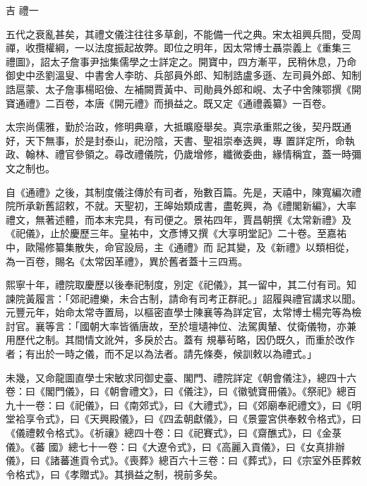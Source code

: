 
\begin{pinyinscope}

 吉
 禮一



 五代之衰亂甚矣，其禮文儀注往往多草創，不能備一代之典。宋太祖興兵間，受周禪，收攬權綱，一以法度振起故弊。即位之明年，因太常博士聶崇義上《重集三
 禮圖》，詔太子詹事尹拙集儒學之士詳定之。開寶中，四方漸平，民稍休息，乃命御史中丞劉溫叟、中書舍人李昉、兵部員外郎、知制誥盧多遜、左司員外郎、知制誥扈蒙、太子詹事楊昭儉、左補闕賈黃中、司勛員外郎和峴、太子中舍陳鄂撰《開寶通禮》二百卷，本唐《開元禮》而損益之。既又定《通禮義纂》一百卷。



 太宗尚儒雅，勤於治政，修明典章，大抵曠廢舉矣。真宗承重熙之後，契丹既通好，天下無事，於是封泰山，祀汾陰，天書、聖祖崇奉迭興，專
 置詳定所，命執政、翰林、禮官參領之。尋改禮儀院，仍歲增修，纖微委曲，緣情稱宜，蓋一時彌文之制也。



 自《通禮》之後，其制度儀注傳於有司者，殆數百篇。先是，天禧中，陳寬編次禮院所承新舊詔敕，不就。天聖初，王皞始類成書，盡乾興，為《禮閣新編》，大率禮文，無著述體，而本末完具，有司便之。景祐四年，賈昌朝撰《太常新禮》及《祀儀》，止於慶歷三年。皇祐中，文彥博又撰《大享明堂記》二十卷。至嘉祐中，歐陽修纂集散失，命官設局，主《通禮》而
 記其變，及《新禮》以類相從，為一百卷，賜名《太常因革禮》，異於舊者蓋十三四焉。



 熙寧十年，禮院取慶歷以後奉祀制度，別定《祀儀》，其一留中，其二付有司。知諫院黃履言：「郊祀禮樂，未合古制，請命有司考正群祀。」詔履與禮官講求以聞。元豐元年，始命太常寺置局，以樞密直學士陳襄等為詳定官，太常博士楊完等為檢討官。襄等言：「國朝大率皆循唐故，至於壇壝神位、法駕輿輦、仗衛儀物，亦兼用歷代之制。其間情文訛舛，多戾於古。蓋有
 規摹茍略，因仍既久，而重於改作者；有出於一時之儀，而不足以為法者。請先條奏，候訓敕以為禮式。」



 未幾，又命龍圖直學士宋敏求同御史臺、閣門、禮院詳定《朝會儀注》，總四十六卷：曰《閣門儀》，曰《朝會禮文》，曰《儀注》，曰《徽號寶冊儀》。《祭祀》總百九十一卷：曰《祀儀》，曰《南郊式》，曰《大禮式》，曰《郊廟奉祀禮文》，曰《明堂袷享令式》，曰《天興殿儀》，曰《四孟朝獻儀》，曰《景靈宮供奉敕令格式》，曰《儀禮敕令格式》。《祈禳》總四十卷：曰《祀賽式》，曰《齋醮式》，曰《金菉儀》。《蕃
 國》總七十一卷：曰《大遼令式》，曰《高麗入貢儀》，曰《女真排辦儀》，曰《諸蕃進貢令式》。《喪葬》總百六十三卷：曰《葬式》，曰《宗室外臣葬敕令格式》，曰《孝贈式》。其損益之制，視前多矣。




\end{pinyinscope}
